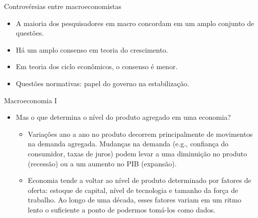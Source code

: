 \documentclass[10pt]{beamer}
\begin{document}
\begin{frame}
    {Controvérsias entre macroeconomistas}
    \begin{itemize}
        \item A maioria dos pesquisadores em macro concordam em um amplo conjunto de questões.\bigskip
        \item Há um amplo consenso em teoria do crescimento.\bigskip
        \item Em teoria dos ciclo econômicos, o consenso é menor.\bigskip
        \item Questões normativas: papel do governo na estabilização.
    \end{itemize}
\end{frame}

\begin{frame}{Macroeconomia I}
    \begin{itemize}
        \item  Mas o que determina o nível do produto agregado em uma economia?\bigskip
              \begin{itemize}
                  \item {} Variações ano a ano no produto decorrem principalmente de movimentos na demanda agregada. Mudanças na demanda (e.g., confiança do consumidor, taxas de juros) podem levar a uma diminuição no produto (recessão) ou a um aumento no PIB (expansão).\medskip

                  \item {} Economia tende a voltar ao nível de produto determinado por fatores de oferta: estoque de capital, nível de tecnologia e tamanho da força de trabalho. Ao longo de uma década, esses fatores variam em um ritmo lento o suficiente a ponto de podermos tomá-los como dados.\medskip


\end{itemize}
\end{itemize}
\end{frame}
\end{document}
